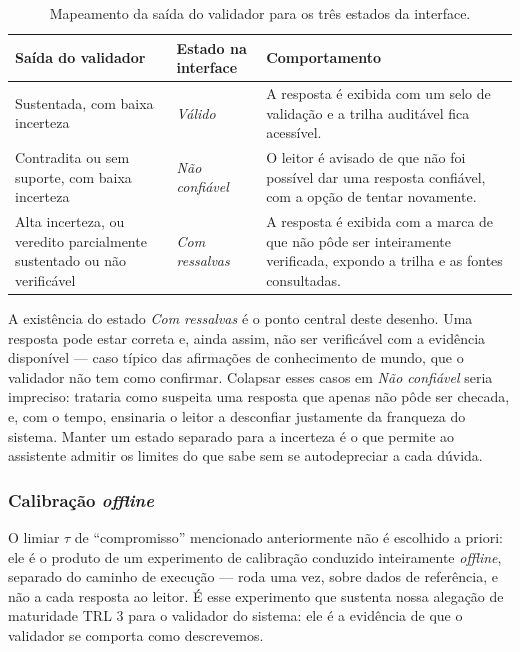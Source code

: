 \begin{table}[ht]
\centering
\caption{Mapeamento da saída do validador para os três estados da interface.}
\label{tab:estados-ui}
\begin{tabularx}{\textwidth}{>{\raggedright\arraybackslash}p{} >{\raggedright\arraybackslash}p{} >{\raggedright\arraybackslash}X}
\toprule
\textbf{Saída do validador} & \textbf{Estado na interface} & \textbf{Comportamento} \\
\midrule
Sustentada, com baixa incerteza & \textit{Válido} & A resposta é exibida com um selo de validação e a trilha auditável fica acessível. \\
\addlinespace
Contradita ou sem suporte, com baixa incerteza & \textit{Não confiável} & O leitor é avisado de que não foi possível dar uma resposta confiável, com a opção de tentar novamente. \\
\addlinespace
Alta incerteza, ou veredito parcialmente sustentado ou não verificável & \textit{Com ressalvas} & A resposta é exibida com a marca de que não pôde ser inteiramente verificada, expondo a trilha e as fontes consultadas. \\
\bottomrule
\end{tabularx}
\end{table}

A existência do estado \textit{Com ressalvas} é o ponto central deste desenho. Uma resposta pode estar correta e, ainda assim, não ser verificável com a evidência disponível --- caso típico das afirmações de conhecimento de mundo, que o validador não tem como confirmar. Colapsar esses casos em \textit{Não confiável} seria impreciso: trataria como suspeita uma resposta que apenas não pôde ser checada, e, com o tempo, ensinaria o leitor a desconfiar justamente da franqueza do sistema. Manter um estado separado para a incerteza é o que permite ao assistente admitir os limites do que sabe sem se autodepreciar a cada dúvida.


\subsubsection*{Calibração \textit{offline}}
\label{subsubsec:calibracao}

O limiar $\tau$ de ``compromisso'' mencionado anteriormente não é escolhido a priori: ele é o produto de um experimento de calibração conduzido inteiramente \textit{offline}, separado do caminho de execução --- roda uma vez, sobre dados de referência, e não a cada resposta ao leitor. É esse experimento que sustenta nossa alegação de maturidade TRL 3 para o validador do sistema: ele é a evidência de que o validador se comporta como descrevemos.

